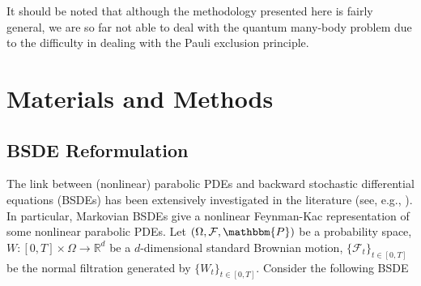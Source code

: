\documentclass[11pt,english]{article}
\providecommand{\R}{{\ensuremath{\mathbb{R}}}}
\renewcommand{\P}{\mathbbm{P}}
\begin{document}
It should be noted that although the methodology
presented here is fairly general, we are so far not able to deal with the
quantum many-body problem due to the difficulty in dealing with the Pauli
exclusion principle. 



\section*{Materials and Methods}
\subsection*{BSDE Reformulation}
The link between (nonlinear) parabolic PDEs and backward stochastic differential equations (BSDEs) has been extensively investigated in the literature 
(see, e.g., \cite{Pardoux1992, Pardoux1999, ElKaroui1997,Gobet2016}). In particular, Markovian BSDEs give a nonlinear Feynman-Kac representation of some nonlinear parabolic PDEs.
Let
$ ( \Omega, \mathcal{F}, \P ) $ 
be a probability space,
$ W \colon [0,T] \times \Omega \to \R^d $
be a $ d $-dimensional standard
Brownian motion,
$ \{ \mathcal{F}_t \}_{ t \in [0,T] } $ 
be the normal filtration generated by $ \{ W_t \}_{ t \in [0,T] } $.
Consider the following BSDE
\end{document}
